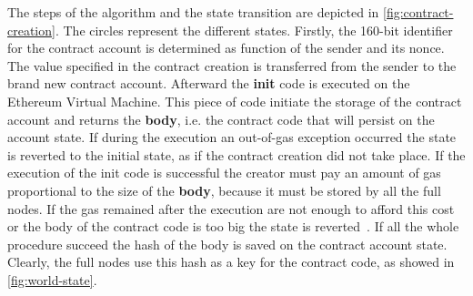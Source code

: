 The steps of the algorithm and the state transition are depicted in
\autoref{fig:contract-creation}. The circles represent the different states.
Firstly, the 160-bit identifier for the contract account is determined as
function of the sender and its nonce. The value specified in the contract
creation is transferred from the sender to the brand new contract account.
Afterward the \textbf{init} code is executed on the Ethereum Virtual Machine.
This  piece of code initiate the storage of the contract account and returns the
\textbf{body}, i.e. the contract code that will persist on the account state.
If during the execution an out-of-gas exception occurred the state is reverted
to the initial state, as if the contract creation did not take place.
If the execution of the init code is successful the creator must pay an amount
of gas proportional to the size of the \textbf{body}, because it must be
stored by all the full nodes. If the gas remained after the execution are not
enough to afford this cost or the body of the contract code is too big the
state is reverted~\cite{wood2018ethereum}.
If all the whole procedure succeed the hash of the body is saved on the
contract account state. Clearly, the full nodes use this hash as a key for the 
contract code, as showed in \autoref{fig:world-state}.
 

